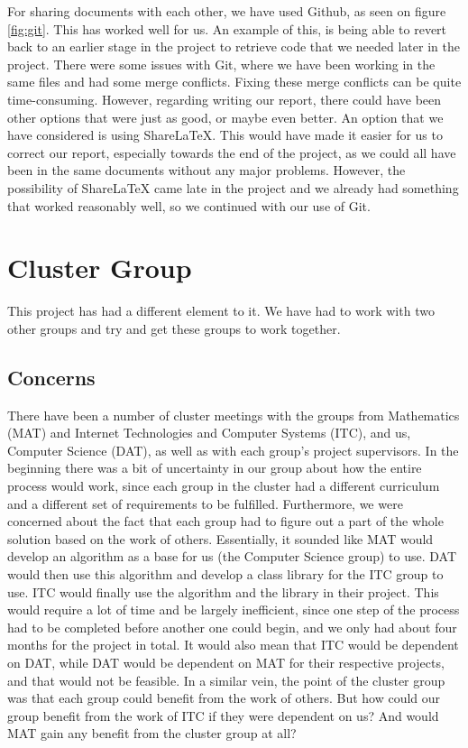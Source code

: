 \documentclass{article}
\begin{document}
For sharing documents with each other, we have used Github, as seen on figure \ref{fig:git}.
This has worked well for us. 
An example of this, is being able to revert back to an earlier stage in the project to retrieve code that we needed later in the project.
There were some issues with Git, where we have been working in the same files and had some merge conflicts.
Fixing these merge conflicts can be quite time-consuming.
However, regarding writing our report, there could have been other options that were just as good, or maybe even better.
An option that we have considered is using ShareLaTeX.
This would have made it easier for us to correct our report, especially towards the end of the project, as we could all have been in the same documents without any major problems.
However, the possibility of ShareLaTeX came late in the project and we already had something that worked reasonably well, so we continued with our use of Git.


\section{Cluster Group}
This project has had a different element to it.
We have had to work with two other groups and try and get these groups to work together.
\subsection*{Concerns}
There have been a number of cluster meetings with the groups from Mathematics (MAT) and Internet Technologies and Computer Systems (ITC), and us, Computer Science (DAT), as well as with each group's project supervisors.
In the beginning there was a bit of uncertainty in our group about how the entire process would work, since each group in the cluster had a different curriculum and a different set of requirements to be fulfilled.
Furthermore, we were concerned about the fact that each group had to figure out a part of the whole solution based on the work of others.
Essentially, it sounded like MAT would develop an algorithm as a base for us (the Computer Science group) to use.
DAT would then use this algorithm and develop a class library for the ITC group to use.
ITC would finally use the algorithm and the library in their project.
This would require a lot of time and be largely inefficient, since one step of the process had to be completed before another one could begin, and we only had about four months for the project in total.
It would also mean that ITC would be dependent on DAT, while DAT would be dependent on MAT for their respective projects, and that would not be feasible.
In a similar vein, the point of the cluster group was that each group could benefit from the work of others.
But how could our group benefit from the work of ITC if they were dependent on us? And would MAT gain any benefit from the cluster group at all?
\end{document}

